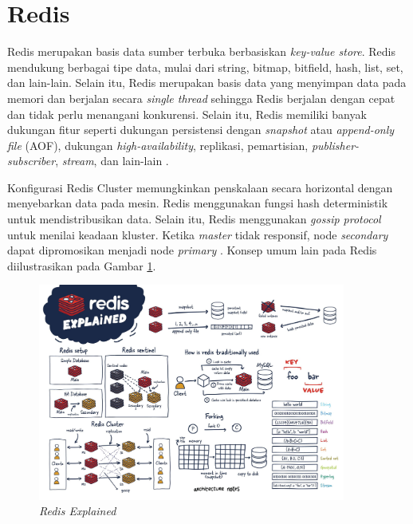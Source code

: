 \section{Redis}

Redis merupakan basis data sumber terbuka berbasiskan \textit{key-value store}. Redis mendukung berbagai tipe data, mulai dari string, bitmap, bitfield, hash, list, set, dan lain-lain. Selain itu, Redis merupakan basis data yang menyimpan data pada memori dan berjalan secara \textit{single thread} sehingga Redis berjalan dengan cepat dan tidak perlu menangani konkurensi. Selain itu, Redis memiliki banyak dukungan fitur seperti dukungan persistensi dengan \textit{snapshot} atau \textit{append-only file} (AOF), dukungan \textit{high-availability}, replikasi, pemartisian, \textit{publisher-subscriber}, \textit{stream}, dan lain-lain \parencite{redisExplained}.

Konfigurasi Redis Cluster memungkinkan penskalaan secara horizontal dengan menyebarkan data pada mesin. Redis menggunakan fungsi hash deterministik untuk mendistribusikan data. Selain itu, Redis menggunakan \textit{gossip protocol} untuk menilai keadaan kluster. Ketika \textit{master} tidak responsif, node \textit{secondary} dapat dipromosikan menjadi node \textit{primary} \parencite{redisExplained}. Konsep umum lain pada Redis diilustrasikan pada Gambar \ref{fig:redis-explained}.

\begin{figure}[H]
    \centering
    \includegraphics[width=0.9\textwidth]{resources/chapter-2/redis.jpg}
    \caption{\textit{Redis Explained \parencite{redisExplained}}}
    \label{fig:redis-explained}
\end{figure}
